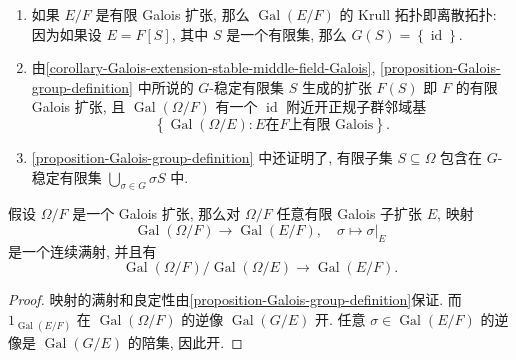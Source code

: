 \begin{remark}
  \label{remark-Galois-group-definition}
  \begin{enumerate}
    \item 如果 \( E/F \) 是有限 Galois 扩张, 那么 \( \operatorname{Gal}(E/F) \)
      的 Krull 拓扑即离散拓扑: 因为如果设 \( E = F[S] \), 其中 \( S \)
      是一个有限集, 那么 \( G(S) = \left\lbrace \operatorname{id} \right\rbrace
      \).
    \item 由\cref{corollary-Galois-extension-stable-middle-field-Galois},
      \cref{proposition-Galois-group-definition} 中所说的 \( G \)-稳定有限集 \(
      S \) 生成的扩张 \( F(S) \) 即 \( F \) 的有限 Galois 扩张, 且 \(
      \operatorname{Gal}(\Omega/F) \) 有一个 \( \operatorname{id} \)
      附近开正规子群邻域基
      \[
        \left\lbrace \operatorname{Gal}(\Omega/E) : E \text{在}F\text{上有限 Galois}
        \right\rbrace.
      \]
    \item \cref{proposition-Galois-group-definition} 中还证明了, 有限子集
      \( S \subseteq \Omega \) 包含在 \( G \)-稳定有限集 \( \bigcup_{\sigma \in
      G} \sigma S \) 中.
  \end{enumerate}
\end{remark}

\begin{proposition}
  \label{proposition-Galois-epimorphism-to-finite-Galois}
  假设 \( \Omega / F \) 是一个 Galois 扩张, 那么对 \( \Omega/F \) 任意有限 Galois
  子扩张 \( E \), 映射
  \[
    \operatorname{Gal}(\Omega/F)\to\operatorname{Gal}(E/F),\quad\sigma \mapsto
    \left. \sigma \right\vert_E
  \]
  是一个连续满射, 并且有
  \[
    \operatorname{Gal}(\Omega/F) / \operatorname{Gal}(\Omega/E) \to
    \operatorname{Gal}(E/F).
  \]
\end{proposition}
\begin{proof}
  映射的满射和良定性由\cref{proposition-Galois-group-definition}保证.
  而 \( 1_{\operatorname{Gal}(E/F)} \) 在 \(
  \operatorname{Gal}(\Omega/F) \) 的逆像 \( \operatorname{Gal}(G/E) \) 开.
  任意 \( \sigma \in \operatorname{Gal}(E/F) \) 的逆像是 \(
  \operatorname{Gal}(G/E) \) 的陪集, 因此开.
\end{proof}

